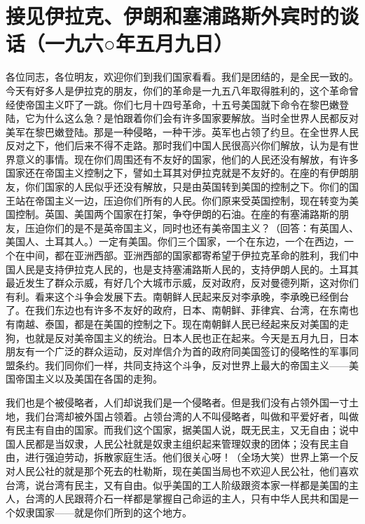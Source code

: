 \section[接见伊拉克、伊朗和塞浦路斯外宾时的谈话（一九六○年五月九日）]{接见伊拉克、伊朗和塞浦路斯外宾时的谈话（一九六○年五月九日）}


各位同志，各位明友，欢迎你们到我们国家看看。我们是团结的，是全民一致的。今天有好多人是伊拉克的朋友，你们的革命是一九五八年取得胜利的，这个革命曾经使帝国主义吓了一跳。你们七月十四号革命，十五号美国就下命令在黎巴嫩登陆，它为什么这么急？是怕跟着你们会有许多国家要解放。当时全世界人民都反对美军在黎巴嫩登陆。那是一种侵略，一种干涉。英军也占领了约旦。在全世界人民反对之下，他们后来不得不走路。那时我们中国人民很高兴你们解放，认为是有世界意义的事情。现在你们周围还有不友好的国家，他们的人民还没有解放，有许多国家还在帝国主义控制之下，譬如土耳其对伊拉克就是不友好的。在座的有伊朗朋友，你们国家的人民似乎还没有解放，只是由英国转到美国的控制之下。你们的国王站在帝国主义一边，压迫你们所有的人民。你们原来受英国控制，现在转变为美国控制。英国、美国两个国家在打架，争夺伊朗的石油。在座的有塞浦路斯的朋友，压迫你们的是不是英帝国主义，同时也还有美帝国主义？（回答：有英国人、美国人、土耳其人。）一定有美国。你们三个国家，一个在东边，一个在西边，一个在中间，都在亚洲西部。亚洲西部的国家都寄希望于伊拉克革命的胜利，我们中国人民是支持伊拉克人民的，也是支持塞浦路斯人民的，支持伊朗人民的。土耳其最近发生了群众示威，有好几个大城市示威，反对政府，反对曼德列斯，这对你们有利。看来这个斗争会发展下去。南朝鲜人民起来反对李承晚，李承晚已经倒台了。在我们东边也有许多不友好的政府，日本、南朝鲜、菲律宾、台湾，在东南也有南越、泰国，都是在美国的控制之下。现在南朝鲜人民已经起来反对美国的走狗，也就是反对美帝国主义的统治。日本人民也正在起来。今天是五月九日，日本朋友有一个广泛的群众运动，反对岸信介为首的政府同美国签订的侵略性的军事同盟条约。我们同你们一样，共同支持这个斗争，反对世界上最大的帝国主义——美国帝国主义以及美国在各国的走狗。

我们也是个被侵略者，人们却说我们是一个侵略者。但是我们没有占领外国一寸土地，我们台湾却被外国占领着。占领台湾的人不叫侵略者，叫做和平爱好者，叫做有民主有自由的国家。而我们这个国家，据美国人说，既无民主，又无自由；说中国人民都是当奴隶，人民公社就是奴隶主组织起来管理奴隶的团体；没有民主自由，进行强迫劳动，拆散家庭生活。他们很关心呀！（全场大笑）世界上第一个反对人民公社的就是那个死去的杜勒斯，现在美国当局也不欢迎人民公社，他们喜欢台湾，说台湾有民主，又有自由。似乎美国的工人阶级跟资本家一样都是美国的主人，台湾的人民跟蒋介石一样都是掌握自己命运的主人，只有中华人民共和国是一个奴隶国家——就是你们所到的这个地方。

